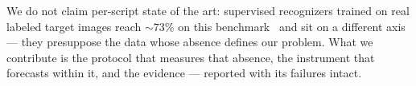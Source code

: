 We do not claim per-script state of the art: supervised recognizers trained on real labeled target
images reach ${\sim}73\%$ on this benchmark~\cite{bstd} and sit on a different axis --- they
presuppose the data whose absence defines our problem. What we contribute is the protocol that
measures that absence, the instrument that forecasts within it, and the evidence --- reported with
its failures intact.

